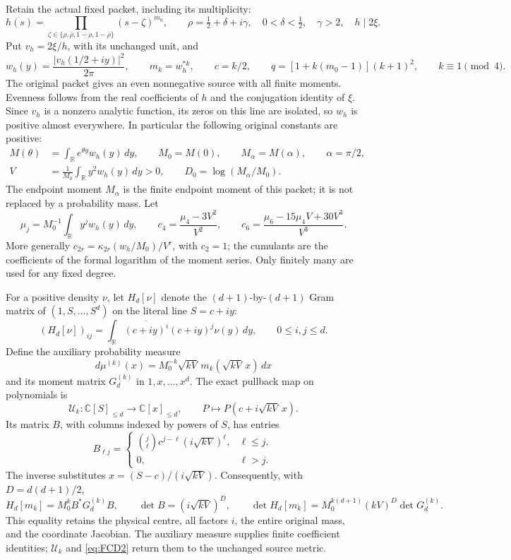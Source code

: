 \documentclass[11pt]{article}
\begin{document}
Retain the actual fixed packet, including its multiplicity:
\[
 h(s)=\prod_{\zeta\in\{\rho,\bar\rho,1-\rho,1-\bar\rho\}}
       (s-\zeta)^{m_0},\qquad
 \rho=\tfrac12+\delta+i\gamma,\quad
 0<\delta<\tfrac12,\quad\gamma>2,\quad h\mid2\xi.
\]
Put \(v_h=2\xi/h\), with its unchanged unit, and
\[
 w_h(y)=\frac{|v_h(1/2+iy)|^2}{2\pi},\qquad
 m_k=w_h^{*k},\qquad c=k/2,\qquad
 q=[1+k(m_0-1)](k+1)^2,\qquad k\equiv1\pmod4.
\]
The original packet gives an even nonnegative source with all finite moments.
Evenness follows from the real coefficients of \(h\) and the conjugation
identity of \(\xi\). Since \(v_h\) is a nonzero analytic function, its
zeros on this line are isolated, so \(w_h\) is positive almost everywhere.
In particular the following original constants are positive:
\begin{equation}
 \begin{split}
 M(\theta)&=\int_{\mathbb R}e^{\theta y}w_h(y)\,dy,\qquad
 M_0=M(0),\qquad M_\alpha=M(\alpha),\qquad \alpha=\pi/2,\\
 V&=\frac1{M_0}\int_{\mathbb R}y^2w_h(y)\,dy>0,\qquad
 D_0=\log(M_\alpha/M_0).
 \end{split}
 \tag{FCD1}\label{eq:FCD1}
\end{equation}
The endpoint moment \(M_\alpha\) is the finite endpoint moment of this
packet; it is not replaced by a probability mass. Let
\[
 \mu_j=M_0^{-1}\int_{\mathbb R}y^jw_h(y)\,dy,\qquad
 c_4=\frac{\mu_4-3V^2}{V^2},\qquad
 c_6=\frac{\mu_6-15\mu_4V+30V^3}{V^3}.
\]
More generally \(c_{2r}=\kappa_{2r}(w_h/M_0)/V^r\), with \(c_2=1\);
the cumulants are the coefficients of the formal logarithm of the moment
series. Only finitely many are used for any fixed degree.

For a positive density \(\nu\), let \(H_d[\nu]\) denote the
\((d+1)\)-by-\((d+1)\) Gram matrix of
\((1,S,\ldots,S^d)\) on the literal line \(S=c+iy\):
\[
 (H_d[\nu])_{ij}
   =\int_{\mathbb R}\overline{(c+iy)^i}(c+iy)^j\nu(y)\,dy,
       \qquad 0\le i,j\le d.
\]
Define the auxiliary probability measure
\[
 d\mu^{(k)}(x)
  =M_0^{-k}\sqrt{kV}\,m_k(\sqrt{kV}\,x)\,dx
\]
and its moment matrix \(G_d^{(k)}\) in \(1,x,\ldots,x^d\).
The exact pullback map on polynomials is
\[
 \mathcal U_k:\mathbb C[S]_{\le d}\longrightarrow\mathbb C[x]_{\le d},
 \qquad P\longmapsto P(c+i\sqrt{kV}\,x).
\]
Its matrix \(B\), with columns indexed by powers of \(S\), has entries
\[
 B_{\ell j}=
 \begin{cases}
 \binom j\ell c^{j-\ell}(i\sqrt{kV})^\ell,&\ell\le j,\\
 0,&\ell>j .
 \end{cases}
\]
The inverse substitutes \(x=(S-c)/(i\sqrt{kV})\).
Consequently, with \(D=d(d+1)/2\),
\begin{equation}
 H_d[m_k]=M_0^kB^*G_d^{(k)}B,\qquad
 \det B=(i\sqrt{kV})^D,\qquad
 \det H_d[m_k]=M_0^{k(d+1)}(kV)^D\det G_d^{(k)} .
 \tag{FCD2}\label{eq:FCD2}
\end{equation}
This equality retains the physical centre, all factors \(i\), the entire
original mass, and the coordinate Jacobian. The auxiliary measure supplies
finite coefficient identities; \(\mathcal U_k\) and \eqref{eq:FCD2}
return them to the unchanged source metric.
\end{document}
